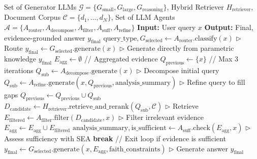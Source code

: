 \documentclass[11pt]{article}
\begin{document}
\begin{algorithm*}[t]
\caption{FAIR-RAG Inference (Prompts for agents are detailed in Appendix B.)}
\label{alg:fairrag}
\small
\begin{algorithmic}[1]
\Require Set of Generator LLMs $\mathcal{G} = \{G_{\text{small}}, G_{\text{large}}, G_{\text{reasoning}}\}$, Hybrid Retriever $H_{\text{retriever}}$, Document Corpus $\mathcal{C} = \{d_1, \ldots, d_N\}$, Set of LLM Agents $\mathcal{A} = \{A_{\text{router}}, A_{\text{decompose}}, A_{\text{filter}}, A_{\text{suff}}, A_{\text{refine}}\}$
\State \textbf{Input:} User query $x$
\State \textbf{Output:} Final, evidence-grounded answer $y_{\text{final}}$
\State $\text{query\_type}, G_{\text{selected}} \leftarrow A_{\text{router}}.\text{classify}(x)$ \hfill $\triangleright$ Route
    \State $y_{\text{final}} \leftarrow G_{\text{selected}}.\text{generate}(x)$ \hfill $\triangleright$ Generate directly from parametric knowledge
    \State \Return $y_{\text{final}}$
\EndIf
\State $E_{\text{agg}} \leftarrow \emptyset$ \hfill // Aggregated evidence
\State $Q_{\text{previous}} \leftarrow \{x\}$
 \hfill // Max 3 iterations
        \State $Q_{\text{sub}} \leftarrow A_{\text{decompose}}.\text{generate}(x)$ \hfill $\triangleright$ Decompose initial query
    \Else
        \State $Q_{\text{sub}} \leftarrow A_{\text{refine}}.\text{generate}(x, Q_{\text{previous}}, \text{analysis\_summary})$ \hfill $\triangleright$ Refine query to fill gaps
    \EndIf
    \State $Q_{\text{previous}} \leftarrow Q_{\text{previous}} \cup Q_{\text{sub}}$
    \State $D_{\text{candidate}} \leftarrow H_{\text{retriever}}.\text{retrieve\_and\_rerank}(Q_{\text{sub}}, \mathcal{C})$ \hfill $\triangleright$ Retrieve
    \State $E_{\text{filtered}} \leftarrow A_{\text{filter}}.\text{filter}(D_{\text{candidate}}, x)$ \hfill $\triangleright$ Filter irrelevant evidence
    \State $E_{\text{agg}} \leftarrow E_{\text{agg}} \cup E_{\text{filtered}}$
    \State $\text{analysis\_summary}, \text{is\_sufficient} \leftarrow A_{\text{suff}}.\text{check}(E_{\text{agg}}, x)$ \hfill $\triangleright$ Assess sufficiency with SEA
        \State \textbf{break} \hfill // Exit loop if evidence is sufficient
    \EndIf
\EndFor
\State $y_{\text{final}} \leftarrow G_{\text{selected}}.\text{generate}(x, E_{\text{agg}}, \text{faith\_constraints})$ \hfill $\triangleright$ Generate answer
\State \Return $y_{\text{final}}$
\end{algorithmic}
\end{algorithm*}
\end{document}
